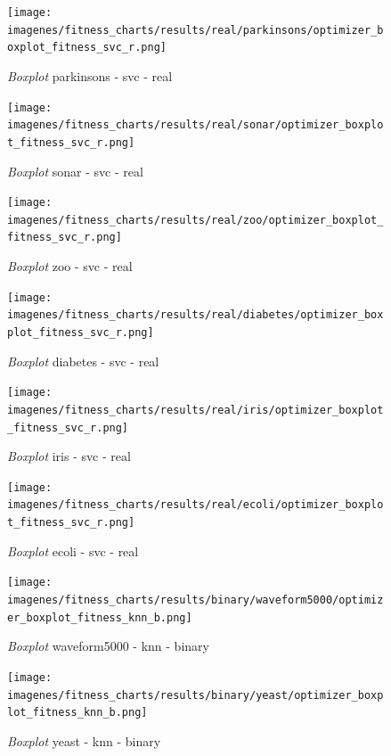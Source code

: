 \begin{figure}[htp]
    \centering
    \texttt{[image: imagenes/fitness\_charts/results/real/parkinsons/optimizer\_boxplot\_fitness\_svc\_r.png]}
    \caption{\textit{Boxplot} parkinsons - svc - real}

\end{figure}

\begin{figure}[htp]
    \centering
    \texttt{[image: imagenes/fitness\_charts/results/real/sonar/optimizer\_boxplot\_fitness\_svc\_r.png]}
    \caption{\textit{Boxplot} sonar - svc - real}

\end{figure}

\begin{figure}[htp]
    \centering
    \texttt{[image: imagenes/fitness\_charts/results/real/zoo/optimizer\_boxplot\_fitness\_svc\_r.png]}
    \caption{\textit{Boxplot} zoo - svc - real}

\end{figure}

\begin{figure}[htp]
    \centering
    \texttt{[image: imagenes/fitness\_charts/results/real/diabetes/optimizer\_boxplot\_fitness\_svc\_r.png]}
    \caption{\textit{Boxplot} diabetes - svc - real}

\end{figure}

\begin{figure}[htp]
    \centering
    \texttt{[image: imagenes/fitness\_charts/results/real/iris/optimizer\_boxplot\_fitness\_svc\_r.png]}
    \caption{\textit{Boxplot} iris - svc - real}

\end{figure}

\begin{figure}[htp]
    \centering
    \texttt{[image: imagenes/fitness\_charts/results/real/ecoli/optimizer\_boxplot\_fitness\_svc\_r.png]}
    \caption{\textit{Boxplot} ecoli - svc - real}

\end{figure}

\begin{figure}[htp]
    \centering
    \texttt{[image: imagenes/fitness\_charts/results/binary/waveform5000/optimizer\_boxplot\_fitness\_knn\_b.png]}
    \caption{\textit{Boxplot} waveform5000 - knn - binary}

\end{figure}

\begin{figure}[htp]
    \centering
    \texttt{[image: imagenes/fitness\_charts/results/binary/yeast/optimizer\_boxplot\_fitness\_knn\_b.png]}
    \caption{\textit{Boxplot} yeast - knn - binary}

\end{figure}

